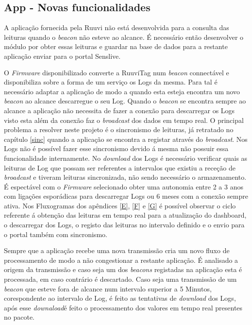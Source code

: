 \subsection{App - Novas funcionalidades}

\par A aplicação fornecida pela Ruuvi não está desenvolvida para a consulta das leituras quando o \textit{beacon} não esteve ao alcance. É necessário então desenvolver o módulo por obter essas leituras e guardar na base de dados para a restante aplicação enviar para o portal Senslive.

\par O \textit{Firmware} disponibilizado converte a RuuviTag num \textit{beacon} connectável e disponibiliza sobre a forma de um serviço os Logs da mesma\cite{ruuvitlog}. Para tal é necessário adaptar a aplicação de modo a quando esta esteja encontra um novo \textit{beacon} ao alcance descarregue o seu Log. Quando o \textit{beacon} se encontra sempre ao alcance a aplicação não necessita de fazer a conexão para descarregar os Logs visto esta além da conexão faz o \textit{broadcast} dos dados em tempo real. O principal problema a resolver neste projeto é o sincronismo de leituras, já retratado no capítulo \ref{sinc} quando a aplicação se encontra a registar através do \textit{broadcast}. Nos Logs não é possível fazer esse sincronismo devido á mesma não possuir essa funcionalidade internamente. No \textit{download} dos Logs é necessário verificar quais as leituras de Log que possam ser referentes a intervalos que existiu a receção de \textit{broadcast} e tiveram leituras sincronizada, não sendo necessário o armazenamento. É espectável com o \textit{Firmware} selecionado obter uma autonomia entre 2 a 3 anos com ligações esporádicas para descarregar Logs ou 6 meses com a conexão sempre ativa. Nos Fluxogramas dos apêndices  \ref{E}, \ref{F} e \ref{G} é possível observar o ciclo referente á obtenção das leituras em tempo real para a atualização do dashboard, o descarregar dos Logs, o registo das leituras no intervalo definido e o envio para o portal também com sincronismo.

\par Sempre que a aplicação recebe uma nova transmissão cria um novo fluxo de processamento de modo a não congestionar a restante aplicação. É analisado a origem da transmissão e caso seja um dos \textit{beacons} registadas na aplicação esta é processada, em caso contrário é descartado. Caso seja uma transmissão de um \textit{beacon} que esteve fora de alcance num intervalo superior a 5 Minutos, corespondente ao intervalo de Log, é feito as tentativas de \textit{download} dos Logs, após esse \textit{downaload}é feito o processamento dos valores em tempo real presentes no pacote. 

